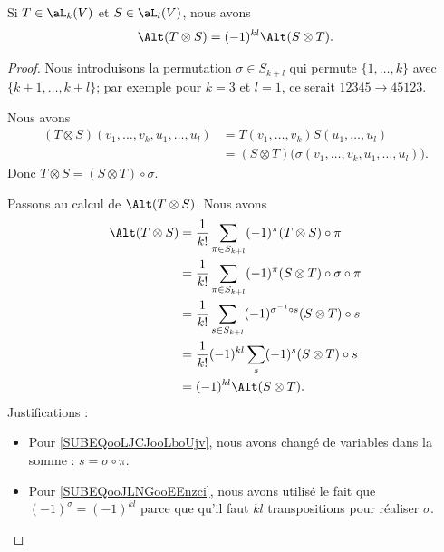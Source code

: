 \begin{lemma}		\label{LEMooIMYIooZIxYRp}
	Si \( T\in\aL_k(V)\) et \( S\in \aL_l(V)\), nous avons
	\begin{equation}
		\Alt(T\otimes S)=(-1)^{kl}\Alt(S\otimes T).
	\end{equation}
\end{lemma}

\begin{proof}
	Nous introduisons la permutation \( \sigma\in S_{k+l}\) qui permute \( \{ 1,\ldots,k \}\) avec \( \{ k+1,\ldots,k+l \}\); par exemple pour \( k=3\) et \( l=1\), ce serait \( 12345\to 45123\).

	Nous avons
	\begin{subequations}
		\begin{align}
			(T\otimes S)(v_1,\ldots,v_k,u_1,\ldots,u_l) & =T(v_1,\ldots,v_k)S(u_1,\ldots, u_l)                            \\
			                                            & =(S\otimes T)\big( \sigma(v_1,\ldots,v_k,u_1,\ldots,u_l) \big).
		\end{align}
	\end{subequations}
	Donc \( T\otimes S=(S\otimes T)\circ \sigma\).

	Passons au calcul de \( \Alt(T\otimes S)\). Nous avons
	\begin{subequations}
		\begin{align}
			\Alt(T\otimes S) & =\frac{1}{ k!}\sum_{\pi\in S_{k+l}}(-1)^{\pi}(T\otimes S)\circ\pi                                          \\
			                 & = \frac{1}{ k!}\sum_{\pi\in S_{k+l}}(-1)^{\pi}(S\otimes T)\circ\sigma\circ\pi                              \\
			                 & =\frac{1}{ k!}\sum_{s\in S_{k+l}}(-1)^{\sigma^{-1}\circ s}(S\otimes T)\circ s		\label{SUBEQooLJCJooLboUjv} \\
			                 & =\frac{1}{ k!}(-1)^{kl}\sum_s(-1)^{s}(S\otimes T)\circ s			\label{SUBEQooJLNGooEEnzci}                     \\
			                 & =(-1)^{kl}\Alt(S\otimes T).
		\end{align}
	\end{subequations}
	Justifications :
	\begin{itemize}
		\item
		      Pour \eqref{SUBEQooLJCJooLboUjv}, nous avons changé de variables dans la somme : \( s=\sigma\circ \pi\).
		\item
		      Pour \eqref{SUBEQooJLNGooEEnzci}, nous avons utilisé le fait que \( (-1)^{\sigma}=(-1)^{kl}\) parce que qu'il faut \( kl\) transpositions pour réaliser \( \sigma\).
	\end{itemize}
\end{proof}

